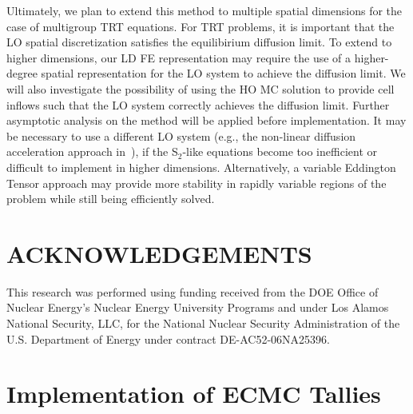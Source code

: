 \documentclass{mc2013}
\begin{document}
Ultimately, we plan to extend this method to multiple spatial dimensions for the 
case of multigroup TRT equations.  For TRT problems, it is important that
the LO spatial discretization satisfies the equilibirium diffusion limit.  To extend
to higher dimensions, our LD FE representation may require the use of a higher-degree
spatial representation for the LO system to achieve the diffusion
limit.  We will also
investigate the possibility of using the HO MC solution to provide cell inflows such
that the LO system correctly achieves the diffusion
limit.  Further asymptotic
analysis on the method will be applied before implementation.    It may be necessary to use a different LO system (e.g., the non-linear diffusion
acceleration approach in~\cite{rmc}), if the S$_2$-like equations become too
inefficient or difficult to implement in higher dimensions.  Alternatively, a
variable Eddington Tensor approach may provide more stability in rapidly variable
regions of the problem while still being
efficiently solved.

\section*{ACKNOWLEDGEMENTS}

This research was performed using funding received from the DOE Office of Nuclear
Energy's Nuclear Energy University Programs and under Los Alamos National Security,
LLC, for the National Nuclear Security Administration of the U.S. Department of
Energy under contract DE-AC52-06NA25396. 


\setlength{\baselineskip}{12pt}


\clearpage
\appendix

\section{Implementation of ECMC Tallies}
\end{document}
